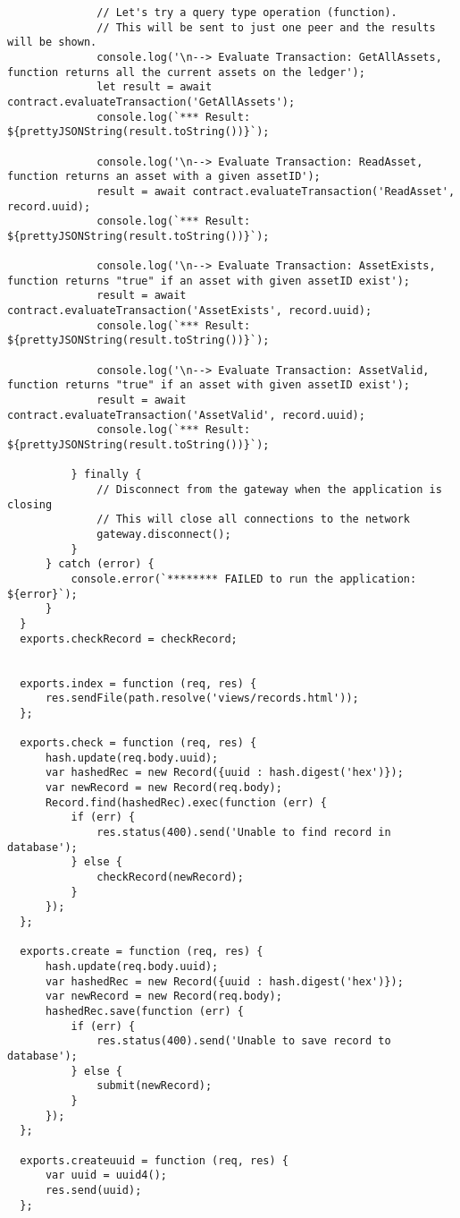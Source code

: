 \begin{lstlisting}
              // Let's try a query type operation (function).
              // This will be sent to just one peer and the results will be shown.
              console.log('\n--> Evaluate Transaction: GetAllAssets, function returns all the current assets on the ledger');
              let result = await contract.evaluateTransaction('GetAllAssets');
              console.log(`*** Result: ${prettyJSONString(result.toString())}`);
  
              console.log('\n--> Evaluate Transaction: ReadAsset, function returns an asset with a given assetID');
              result = await contract.evaluateTransaction('ReadAsset', record.uuid);
              console.log(`*** Result: ${prettyJSONString(result.toString())}`);
  
              console.log('\n--> Evaluate Transaction: AssetExists, function returns "true" if an asset with given assetID exist');
              result = await contract.evaluateTransaction('AssetExists', record.uuid);
              console.log(`*** Result: ${prettyJSONString(result.toString())}`);
  
              console.log('\n--> Evaluate Transaction: AssetValid, function returns "true" if an asset with given assetID exist');
              result = await contract.evaluateTransaction('AssetValid', record.uuid);
              console.log(`*** Result: ${prettyJSONString(result.toString())}`);
              
          } finally {
              // Disconnect from the gateway when the application is closing
              // This will close all connections to the network
              gateway.disconnect();
          }
      } catch (error) {
          console.error(`******** FAILED to run the application: ${error}`);
      }
  }
  exports.checkRecord = checkRecord;
  
  
  exports.index = function (req, res) {
      res.sendFile(path.resolve('views/records.html'));
  };
  
  exports.check = function (req, res) {
      hash.update(req.body.uuid);
      var hashedRec = new Record({uuid : hash.digest('hex')});
      var newRecord = new Record(req.body);
      Record.find(hashedRec).exec(function (err) {
          if (err) {
              res.status(400).send('Unable to find record in database');
          } else {
              checkRecord(newRecord);
          }
      });
  };
  
  exports.create = function (req, res) {
      hash.update(req.body.uuid);
      var hashedRec = new Record({uuid : hash.digest('hex')});
      var newRecord = new Record(req.body);
      hashedRec.save(function (err) {
          if (err) {
              res.status(400).send('Unable to save record to database');
          } else {
              submit(newRecord);
          }
      });
  };
  
  exports.createuuid = function (req, res) {
      var uuid = uuid4();
      res.send(uuid);
  };
\end{lstlisting}

